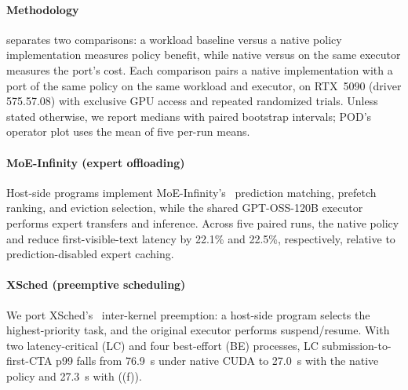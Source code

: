 \paragraph{Methodology}
 separates two comparisons: a workload baseline versus a native policy implementation measures policy benefit, while native versus \sys{} on the same executor measures the port's cost.
Each comparison pairs a native implementation with a \sys{} port of the same policy on the same workload and executor, on RTX~5090 (driver 575.57.08) with exclusive GPU access and repeated randomized trials.
Unless stated otherwise, we report medians with paired bootstrap intervals; POD's operator plot uses the mean of five per-run means.

\paragraph{MoE-Infinity (expert offloading)}
Host-side \sys{} programs implement MoE-Infinity's~\cite{xue2025moeinfinity} prediction matching, prefetch ranking, and eviction selection, while the shared GPT-OSS-120B executor performs expert transfers and inference.
Across five paired runs, the native policy and \sys{} reduce first-visible-text latency by 22.1\% and 22.5\%, respectively, relative to prediction-disabled expert caching.

\paragraph{XSched (preemptive scheduling)}
We port XSched's~\cite{shen2025xsched} inter-kernel preemption: a host-side \sys{} program selects the highest-priority task, and the original executor performs suspend/resume.
With two latency-critical (LC) and four best-effort (BE) processes, LC submission-to-first-CTA p99 falls from 76.9~s under native CUDA to 27.0~s with the native policy and 27.3~s with \sys{} ((f)).

